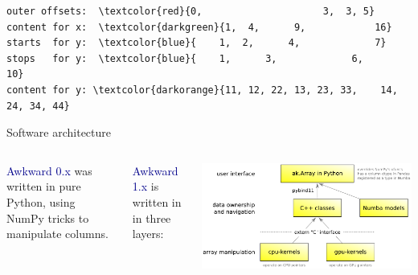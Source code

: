 \documentclass[aspectratio=169]{beamer}
\begin{document}
\begin{frame}[fragile]{}
\begin{onlyenv}
\vspace{0.25 cm}
\begin{Verbatim}[commandchars=\\\{\}]
outer offsets:  \textcolor{red}{0,                     3,  3, 5}
content for x:  \textcolor{darkgreen}{1,  4,      9,            16}
starts  for y:  \textcolor{blue}{    1,  2,      4,             7}
stops   for y:  \textcolor{blue}{    1,      3,             6,            10}
content for y: \textcolor{darkorange}{11, 12, 22, 13, 23, 33,    14, 24, 34, 44}
\end{Verbatim}
\vspace{5 cm}
\end{onlyenv}
\end{frame}

\begin{frame}{Software architecture}
\large
\vspace{0.5 cm}
\begin{columns}
\textcolor{darkblue}{Awkward 0.x} was written in pure Python, using NumPy tricks to manipulate columns.

\vspace{0.5 cm}
\textcolor{darkblue}{Awkward 1.x} is written in in three layers:

\begin{center}
\includegraphics[width=0.7\linewidth]{img/awkward-1-0-layers.pdf}
\end{center}
\end{columns}
\end{frame}


\end{document}
